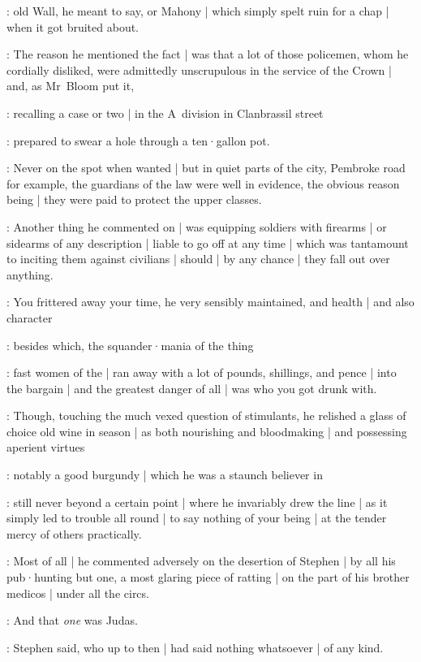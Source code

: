 :
old Wall,
he meant to say,
or Mahony |
which simply spelt ruin for a chap |
when it got bruited about.

:
The reason he mentioned the fact |
was that a lot of those policemen,
whom he cordially disliked,
were admittedly unscrupulous in the service of the Crown |
and,
as Mr~Bloom put it,

:
recalling a case or two |
in the A~division in Clanbrassil street

:
prepared to swear a hole through a ten·gallon pot.

:
Never on the spot when wanted |
but in quiet parts of the city,
Pembroke road for example,
the guardians of the law were well in evidence,
the obvious reason being |
they were paid to protect the upper classes.

:
Another thing he commented on |
was equipping soldiers with firearms |
or sidearms of any description |
liable to go off at any time |
which was tantamount to inciting them against civilians |
should |
by any chance |
they fall out over anything.

:
You frittered away your time,
he very sensibly maintained,
and health |
and also character

:
besides which,
the squander·mania of the thing

:
fast women of the  |
ran away with a lot of pounds,
shillings,
and pence |
into the bargain |
and the greatest danger of all |
was who you got drunk with.

:
Though,
touching the much vexed question of stimulants,
he relished a glass of choice old wine in season |
as both nourishing and bloodmaking |
and possessing aperient virtues

:
notably a good burgundy |
which he was a staunch believer in

:
still never beyond a certain point |
where he invariably drew the line |
as it simply led to trouble all round |
to say nothing of your being |
at the tender mercy of others practically.

:
Most of all |
he commented adversely on the desertion of Stephen |
by all his pub·hunting  but one,
a most glaring piece of ratting |
on the part of his brother medicos |
under all the circs.

\Stephen:
And that \emph{one} was Judas.

:
Stephen said,
who up to then |
had said nothing whatsoever |
of any kind.

